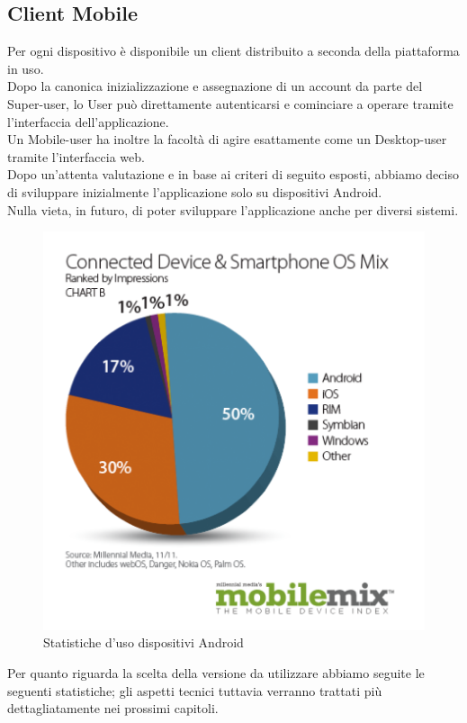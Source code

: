 \subsection{Client Mobile}
Per ogni dispositivo è disponibile un client distribuito a seconda della piattaforma in uso.\\
Dopo la canonica inizializzazione e assegnazione di un account da parte del Super-user, lo User può direttamente autenticarsi e cominciare a operare tramite l'interfaccia dell'applicazione.\\ 
Un Mobile-user ha inoltre la facoltà di agire esattamente come un Desktop-user tramite l'interfaccia web.\\
Dopo un'attenta valutazione e in base ai criteri di seguito esposti, abbiamo deciso di sviluppare inizialmente l'applicazione solo su dispositivi Android.\\
Nulla vieta, in futuro, di poter sviluppare l'applicazione anche per diversi sistemi.

\begin{figure}[H]
\centering
\caption{Statistiche d'uso dispositivi Android}
\includegraphics[scale=0.50]{images/cap1/statAndroid} 
\end{figure}

Per quanto riguarda la scelta della versione da utilizzare abbiamo seguite le seguenti statistiche; gli aspetti tecnici tuttavia verranno trattati più dettagliatamente nei prossimi capitoli.\\

